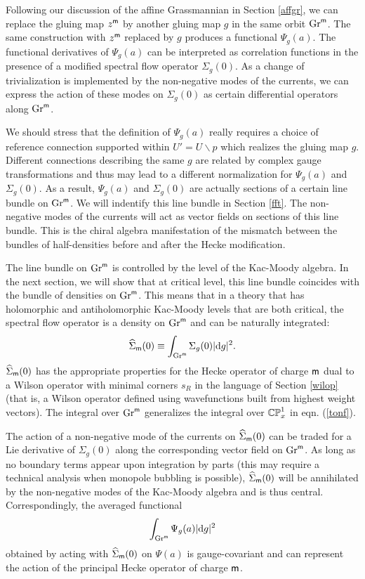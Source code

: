\documentclass[11pt,a4paper]{article}
\begin{document}
Following our discussion of the affine Grassmannian in Section \ref{affgr}, we can 
replace the gluing map $z^{\sf m}$ by another gluing map $g$ in the same orbit ${\mathrm{Gr}}^{\sf m}$.
The same construction with $z^{\sf m}$ replaced by $g$ produces a functional $\Psi_{g}(a)$. The functional derivatives of $\Psi_{g}(a)$ can be interpreted as correlation functions in the presence of a modified spectral flow operator $\Sigma_{g}(0)$. As a change of trivialization is implemented by the non-negative modes of the currents, we can express the action of these modes on $\Sigma_{g}(0)$ as certain differential operators along ${\mathrm{Gr}}^{\sf m}$.

We should stress that the definition of $\Psi_{g}(a)$ really requires a choice of reference connection supported within $U'=U\backslash p$ which realizes the gluing map $g$. Different connections describing the same $g$ are related by complex gauge transformations and 
thus may lead to a different normalization for $\Psi_{g}(a)$ and $\Sigma_{g}(0)$. As a result, $\Psi_{g}(a)$ and $\Sigma_{g}(0)$ are 
actually sections of a certain line bundle on ${\mathrm{Gr}}^{\sf m}$. We will indentify this line bundle in Section \ref{fft}.
The non-negative modes of the currents will act as vector fields on sections of
this line bundle. This is the chiral algebra manifestation of the mismatch between the bundles of half-densities before and after the Hecke modification. 

The line bundle on ${\mathrm{Gr}}^{\sf m}$ is controlled by the level of the Kac-Moody algebra. In the next section, we will show that
at critical level, this line bundle coincides with the bundle of densities on ${\mathrm{Gr}}^{\sf m}$. This means that in a theory that has holomorphic and antiholomorphic
Kac-Moody levels that are both critical, the spectral flow operator is a density on ${\mathrm{Gr}}^{\sf m}$ and can be naturally integrated:
 \begin{equation}\label{tendef}
\widehat\Sigma_{\sf m}(0) \equiv \int_{{\mathrm{Gr}}^{\sf m}}\Sigma_{g}(0) |\mathrm d g|^2.
 \end{equation}
$\widehat\Sigma_{\sf m}(0)$  has the appropriate properties for the Hecke operator of charge ${\sf m}$ dual to a Wilson operator
with minimal corners $s_{R}$ in the language of Section \ref{wilop} (that is, a Wilson
operator defined using wavefunctions built from highest weight vectors).  The integral over ${\mathrm{Gr}}^{\sf m}$ generalizes the integral over ${\mathbb{CP}}^1_x$ in eqn. (\ref{tonf}).
 
The action of a non-negative mode of the currents on $\widehat\Sigma_{\sf m}(0)$ can be traded for a 
Lie derivative of $\Sigma_{g}(0)$ along the corresponding vector field on ${\mathrm{Gr}}^{\sf m}$. As long as no boundary terms appear upon integration by parts (this may
require a technical analysis when monopole bubbling is possible), $\widehat\Sigma_{\sf m}(0)$ will be annihilated by the non-negative modes of the Kac-Moody algebra and is thus central. Correspondingly, the averaged functional 
 \begin{equation} \label{eq:chirhecke}
\int_{{\mathrm{Gr}}^{\sf m}}\Psi_{g}(a)|\mathrm d g|^2
 \end{equation}
 obtained by acting with $\widehat\Sigma_{\sf m}(0)$ on $\Psi(a)$ 
is gauge-covariant and can represent the action of the principal Hecke operator of charge ${\sf m}$.
\end{document}
